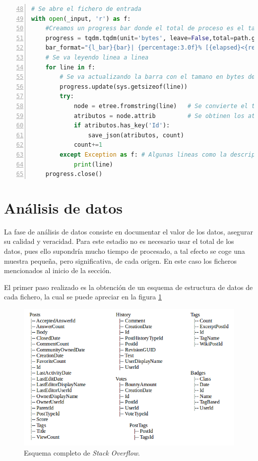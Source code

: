 \begin{lstlisting}[label=stof:xml2jsonMain,language=Python,frame=single,caption=Fragmento de código del script ``xml2json.py'' encargado de la persistencia de resultados., firstnumber=48,numbers=left]
# Se abre el fichero de entrada
with open(_input, 'r') as f:
	#Creamos un progress bar donde el total de proceso es el tamano del fichero
	progress = tqdm.tqdm(unit='bytes', leave=False,total=path.getsize(_input), \
	bar_format="{l_bar}{bar}| {percentage:3.0f}% [{elapsed}<{remaining}, {rate_fmt}{postfix}]")
	# Se va leyendo linea a linea
	for line in f:
		# Se va actualizando la barra con el tamano en bytes de la linea leida.
		progress.update(sys.getsizeof(line)) 
		try:
			node = etree.fromstring(line) 	# Se convierte el texto en un arbol
			atributos = node.attrib 		# Se obtinen los atributos
			if atributos.has_key('Id'):	
				save_json(atributos, count)
			count+=1
		except Exception as f: # Algunas lineas como la descripcion de formato dan error
			print(line)
	progress.close()
\end{lstlisting}

\clearpage
\section{Análisis de datos}
La fase de análisis de datos consiste en documentar el valor de los datos, asegurar su calidad y veracidad. Para este estadio no es necesario usar el total de los datos, pues ello supondría mucho tiempo de procesado, a tal efecto se coge una muestra pequeña, pero significativa, de cada origen. En este caso los ficheros mencionados al inicio de la sección.

El primer paso realizado es la obtención de un esquema de estructura de datos de cada fichero, la cual se puede apreciar en la figura \ref{stof:fullschema}

\begin{figure}[htp!] 
	\centering		
	\caption{Esquema completo de \textit{Stack Overflow}.}
	\label{stof:fullschema}
	\vspace{5pt}
	\includegraphics[scale=0.68]{graphics/schema-stack} 
\end{figure}

